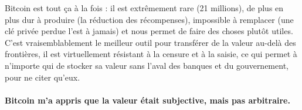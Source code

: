 Bitcoin est tout ça à la fois : il est extrêmement rare (21 millions), de plus
en plus dur à produire (la réduction des récompenses), impossible à remplacer
(une clé privée perdue l'est à jamais) et nous permet de faire des choses plutôt
utiles. C'est vraisemblablement le meilleur outil pour transférer de la valeur
au-delà des frontières, il est virtuellement résistant à la censure et à la
saisie, ce qui permet à n'importe qui de stocker sa valeur sans l'aval des
banques et du gouvernement, pour ne citer qu'eux.

\paragraph{Bitcoin m'a appris que la valeur était subjective, mais pas
arbitraire.}

%
%
%
%
